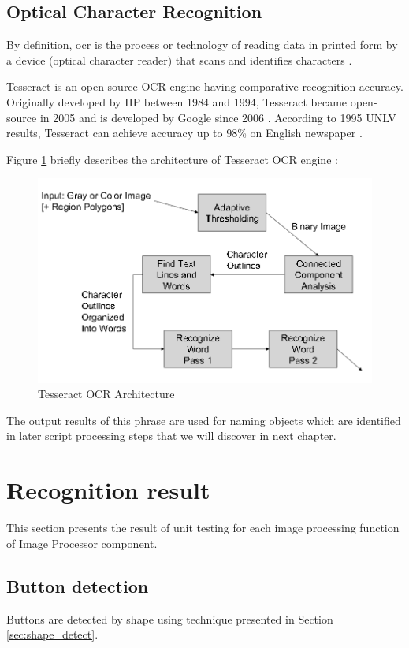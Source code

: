 \subsection{Optical Character Recognition}
\label{sec:ocr}
By definition, \gls{ocr} is the process or technology of reading data in printed form by a device (optical character reader) that scans and identifies characters \cite{ocr_def}.

Tesseract is an open-source OCR engine having comparative recognition accuracy. Originally developed by HP between 1984 and 1994, Tesseract became open-source in 2005 and is developed by Google since 2006 \cite{ocr_overview}. According to 1995 UNLV results, Tesseract can achieve accuracy up to 98\% on English newspaper \cite{Rice_thefourth}.

Figure \ref{fig:tesseract_arch} briefly describes the architecture of Tesseract OCR engine \cite{tesseract_oscon}:

	\begin{figure}[H]
		\centering
		\includegraphics[scale=0.5]{Chapters/Fig/tesseract_arch.png}
		\caption{Tesseract OCR Architecture}
		\label{fig:tesseract_arch}
	\end{figure}

The output results of this phrase are used for naming objects which are identified in later script processing steps that we will discover in next chapter.

\section{Recognition result}
This section presents the result of unit testing for each image processing function of Image Processor component.

\subsection{Button detection}
Buttons are detected by shape using technique presented in Section \ref{sec:shape_detect}.

